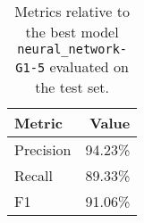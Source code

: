 \begin{table}[H]
\centering
\capstart
\begin{tabularx}{0.48\textwidth}{|X|r|}
\hline
Metric & Value \\
\hline
Precision & 94.23\% \\
Recall & 89.33\% \\
F1 & 91.06\% \\
\hline
\end{tabularx}
\caption{Metrics relative to the best model \texttt{neural\_network-G1-5} evaluated on the test set.}
\label{tab:best_model_metrics_test}

\end{table}
